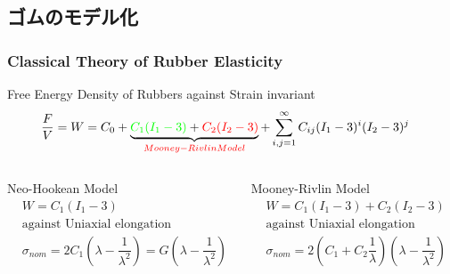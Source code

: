 \documentclass[12pt, dvipdfmx]{beamer}
\begin{document}
\subsection{ゴムのモデル化}
\begin{frame}
    \frametitle{Classical Theory of Rubber Elasticity}
        \vspace{-2mm}
		\begin{block}{Free Energy Density of Rubbers against Strain invariant}
			\vspace{-2mm}
			\scriptsize
			\begin{align*}
				\dfrac{F}{V} = W 
				&= C_0 + \underbrace{{\color{green}C_1(I_1-3)} + {\color{red}C_2(I_2-3)}}_{\color{red}Mooney-Rivlin Model} + \sum_{i,j = 1}^{\infty} C_{ij}(I_1-3)^i(I_2-3)^j
			\end{align*}  
		\end{block}
		\vspace{-5mm}
		\begin{columns}[T, onlytextwidth]
				\begin{exampleblock}{Neo-Hookean Model}
					\vspace{-2mm}
						\scriptsize
						\begin{align*}
							&W = C_1 (I_1-3) \\
							&\text{against Uniaxial elongation} \\
							&\sigma_{nom} = 2 C_1\left(\lambda - \dfrac{1}{\lambda^2}\right) = G \left(\lambda - \dfrac{1}{\lambda^2}\right)
						\end{align*}
				\end{exampleblock}
				\begin{alertblock}{Mooney-Rivlin Model}
					\vspace{-2mm}
					\scriptsize
					\begin{align*}
						&W = C_1 (I_1-3) + C_2(I_2-3) \\
						&\text{against Uniaxial elongation} \\
						&\sigma_{nom} = 2 \left(C_1 + C_2\dfrac{1}{\lambda} \right) \left(\lambda - \dfrac{1}{\lambda^2}\right)
					\end{align*}
				\end{alertblock}
		\end{columns}
		\vspace{-1mm}

\end{frame}
\end{document}
